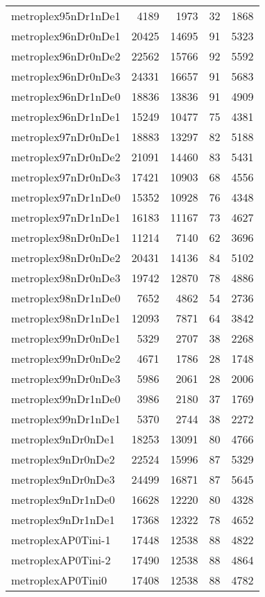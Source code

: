 \begin{longtable}{lrrrr}
metroplex95nDr1nDe1 & 4189 & 1973 & 32 & 1868 \\
metroplex96nDr0nDe1 & 20425 & 14695 & 91 & 5323 \\
metroplex96nDr0nDe2 & 22562 & 15766 & 92 & 5592 \\
metroplex96nDr0nDe3 & 24331 & 16657 & 91 & 5683 \\
metroplex96nDr1nDe0 & 18836 & 13836 & 91 & 4909 \\
metroplex96nDr1nDe1 & 15249 & 10477 & 75 & 4381 \\
metroplex97nDr0nDe1 & 18883 & 13297 & 82 & 5188 \\
metroplex97nDr0nDe2 & 21091 & 14460 & 83 & 5431 \\
metroplex97nDr0nDe3 & 17421 & 10903 & 68 & 4556 \\
metroplex97nDr1nDe0 & 15352 & 10928 & 76 & 4348 \\
metroplex97nDr1nDe1 & 16183 & 11167 & 73 & 4627 \\
metroplex98nDr0nDe1 & 11214 & 7140 & 62 & 3696 \\
metroplex98nDr0nDe2 & 20431 & 14136 & 84 & 5102 \\
metroplex98nDr0nDe3 & 19742 & 12870 & 78 & 4886 \\
metroplex98nDr1nDe0 & 7652 & 4862 & 54 & 2736 \\
metroplex98nDr1nDe1 & 12093 & 7871 & 64 & 3842 \\
metroplex99nDr0nDe1 & 5329 & 2707 & 38 & 2268 \\
metroplex99nDr0nDe2 & 4671 & 1786 & 28 & 1748 \\
metroplex99nDr0nDe3 & 5986 & 2061 & 28 & 2006 \\
metroplex99nDr1nDe0 & 3986 & 2180 & 37 & 1769 \\
metroplex99nDr1nDe1 & 5370 & 2744 & 38 & 2272 \\
metroplex9nDr0nDe1 & 18253 & 13091 & 80 & 4766 \\
metroplex9nDr0nDe2 & 22524 & 15996 & 87 & 5329 \\
metroplex9nDr0nDe3 & 24499 & 16871 & 87 & 5645 \\
metroplex9nDr1nDe0 & 16628 & 12220 & 80 & 4328 \\
metroplex9nDr1nDe1 & 17368 & 12322 & 78 & 4652 \\
metroplexAP0Tini-1 & 17448 & 12538 & 88 & 4822 \\
metroplexAP0Tini-2 & 17490 & 12538 & 88 & 4864 \\
metroplexAP0Tini0 & 17408 & 12538 & 88 & 4782 \\

\end{longtable}
